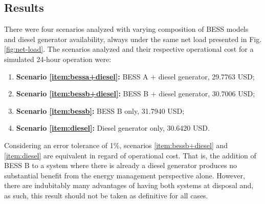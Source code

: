 \documentclass{ieeeaccess}
\begin{document}
    \subsection{Results}
    There were four scenarios analyzed with varying composition of BESS models and diesel generator availability, always under the same net load presented in Fig. \ref{fig:net-load}. The scenarios analyzed and their respective operational cost for a simulated 24-hour operation were:
    \begin{enumerate}
        \item \label{item:bessa+diesel} \textbf{Scenario \ref{item:bessa+diesel}:} BESS A + diesel generator, 29.7763 USD;
        \item \label{item:bessb+diesel} \textbf{Scenario \ref{item:bessb+diesel}:} BESS B + diesel generator, 30.7006 USD;
        \item \label{item:bessb} \textbf{Scenario \ref{item:bessb}:} BESS B only, 31.7940 USD;
        \item \label{item:diesel} \textbf{Scenario \ref{item:diesel}:} Diesel generator only, 30.6420 USD.
    \end{enumerate}

    Considering an error tolerance of 1\%, scenarios \ref{item:bessb+diesel} and \ref{item:diesel} are equivalent in regard of operational cost. That is, the addition of BESS B to a system where there is already a diesel generator produces no substantial benefit from the energy management perspective alone. However, there are indubitably many advantages of having both systems at disposal and, as such, this result should not be taken as definitive for all cases.
\end{document}
